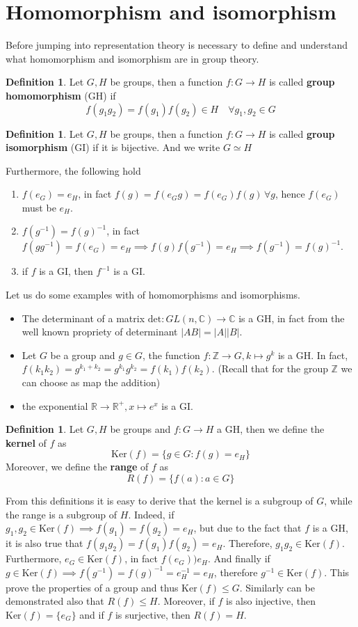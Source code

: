 \documentclass[12pt]{book}
\theoremstyle{plain}
\newcommand{\R}{\mathbb{R}}
\newcommand{\Z}{\mathbb{Z}}
\newcommand{\C}{\mathbb{C}}
\theoremstyle{definition}
\newtheorem{dfn}[thm]{Definition}
\theoremstyle{remark}
\begin{document}
\section{Homomorphism and isomorphism}
Before jumping into representation theory is necessary to define and understand what homomorphism and isomorphism are in group theory.
\begin{dfn}
Let $G,H$ be groups, then a function $f:G\to H$ is called \textbf{group homomorphism} (GH) if
\[f(g_1g_2) = f(g_1)f(g_2)\in H\quad \forall g_1,g_2\in G\]
\end{dfn}
\begin{dfn}
Let $G,H$ be groups, then a function $f:G\to H$ is called \textbf{group isomorphism} (GI) if it is bijective. And we write $G\simeq H$
\end{dfn}
Furthermore, the following hold
\begin{enumerate}
	\item $f(e_G) = e_H$, in fact $f(g) = f(e_Gg)=f(e_G)f(g)\,\forall g$, hence $f(e_G)$ must be $e_H$.
	\item $f(g^{-1}) = f(g)^{-1}$, in fact $f(gg^{-1})=f(e_G) = e_H \implies f(g)f(g^{-1}) = e_H \implies f(g^{-1}) = f(g)^{-1}$.
	\item if $f$ is a GI, then $f^{-1}$ is a GI.
\end{enumerate}
Let us do some examples with of homomorphisms and isomorphisms.
\begin{itemize}
\item The determinant of a matrix $\text{det}:GL(n,\C) \to \C$ is a GH, in fact from the well known propriety of determinant $|AB| = |A||B|$.
\item Let $G$ be a group and $g\in G$, the function $f:\Z \to G,k\mapsto g^k$ is a GH. In fact, $f(k_1k_2) = g^{k_1+k_2} = g^{k_1}g^{k_2} = f(k_1)f(k_2)$. (Recall that for the group $\Z$ we can choose as map the addition)
\item the exponential $\R\to \R^+, x\mapsto e^x$ is a GI.
\end{itemize}
\begin{dfn}
Let $G,H$ be groups and $f:G\to H$ a GH, then we define the \textbf{kernel} of $f$ as
\[\text{Ker}(f) = \{g\in G:f(g)=e_H\}\]
Moreover, we define the \textbf{range} of $f$ as
\[R(f) = \{f(a):a\in G\}\]
\end{dfn}
From this definitions it is easy to derive that the kernel is a subgroup of $G$, while the range is a subgroup of $H$. Indeed, if $g_1,g_2\in \text{Ker}(f)\implies f(g_1)=f(g_2)=e_H$, but due to the fact that $f$ is a GH, it is also true that $f(g_1g_2) = f(g_1)f(g_2)=e_H$. Therefore, $g_1g_2\in \text{Ker}(f)$. Furthermore, $e_G\in \text{Ker}(f)$, in fact $f(e_G) ) e_H$. And finally if $g\in \text{Ker}(f)\implies f(g^{-1}) = f(g)^{-1} = e_H^{-1} = e_H$, therefore $g^{-1}\in\text{Ker}(f)$. This prove the properties of a group and thus $\text{Ker}(f)\leq G$. Similarly can be demonstrated also that $R(f)\leq H$. Moreover, if $f$ is also injective, then $\text{Ker}(f) = \{e_G\}$ and if $f$ is surjective, then $R(f) = H$. \\
\end{document}
